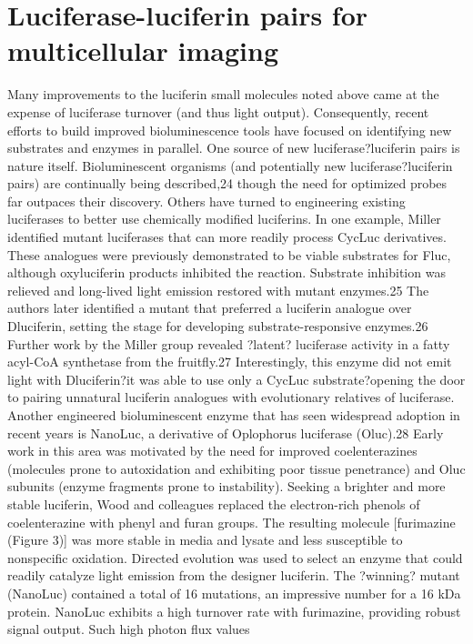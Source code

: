 \section{Luciferase-luciferin pairs for multicellular imaging}
Many improvements to the luciferin small molecules noted
above came at the expense of luciferase turnover (and thus light
output). Consequently, recent efforts to build improved
bioluminescence tools have focused on identifying new
substrates and enzymes in parallel. One source of new
luciferase?luciferin pairs is nature itself. Bioluminescent
organisms (and potentially new luciferase?luciferin pairs) are
continually being described,24 though the need for optimized
probes far outpaces their discovery. Others have turned to
engineering existing luciferases to better use chemically
modified luciferins. In one example, Miller identified mutant
luciferases that can more readily process CycLuc derivatives.
These analogues were previously demonstrated to be viable
substrates for Fluc, although oxyluciferin products inhibited the
reaction. Substrate inhibition was relieved and long-lived light
emission restored with mutant enzymes.25 The authors later
identified a mutant that preferred a luciferin analogue over Dluciferin,
setting the stage for developing substrate-responsive
enzymes.26 Further work by the Miller group revealed ?latent?
luciferase activity in a fatty acyl-CoA synthetase from the
fruitfly.27 Interestingly, this enzyme did not emit light with Dluciferin?it
was able to use only a CycLuc substrate?opening
the door to pairing unnatural luciferin analogues with
evolutionary relatives of luciferase.
Another engineered bioluminescent enzyme that has seen
widespread adoption in recent years is NanoLuc, a derivative of
Oplophorus luciferase (Oluc).28 Early work in this area was
motivated by the need for improved coelenterazines (molecules
prone to autoxidation and exhibiting poor tissue penetrance)
and Oluc subunits (enzyme fragments prone to instability).
Seeking a brighter and more stable luciferin, Wood and
colleagues replaced the electron-rich phenols of coelenterazine
with phenyl and furan groups. The resulting molecule
[furimazine (Figure 3)] was more stable in media and lysate
and less susceptible to nonspecific oxidation. Directed
evolution was used to select an enzyme that could readily
catalyze light emission from the designer luciferin. The
?winning? mutant (NanoLuc) contained a total of 16
mutations, an impressive number for a 16 kDa protein.
NanoLuc exhibits a high turnover rate with furimazine,
providing robust signal output. Such high photon flux values
